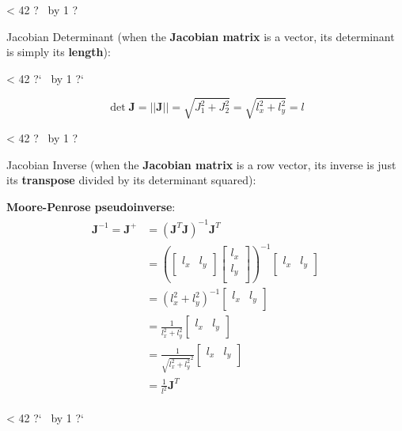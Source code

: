 \documentclass[10pt,b5paper,titlepage]{book}
\newcommand{\m}{\mathbf}
\newcommand{\repeatit}[3][10]{%
    \myloopcounter1%
    \loop\ifnum\myloopcounter < #1
    #2#3%
    \advance\myloopcounter by 1%
    \repeat%
    #2%
}
\newenvironment{qbox}
{
\begin{center}
    \repeatit[42]{?}{\ }
\end{center}
}
{
\begin{center}
    \repeatit[42]{?`}{\ }
\end{center}
}
\newenvironment{eqarray}
{
    \begin{eqnarray}
        \begin{aligned}
}
{
        \end{aligned}
    \end{eqnarray}
}
\begin{document}
\begin{qbox}

    Jacobian Determinant (when the \textbf{Jacobian matrix} is a vector, its
    determinant is simply its \textbf{length}):

\end{qbox}

\begin{equation}
    \det \m{J} = || \m{J} || = \sqrt{J_1^2 + J_2^2} = \sqrt{l_x^2 + l_y^2} = l
\end{equation}


\begin{qbox}

    Jacobian Inverse (when the \textbf{Jacobian matrix} is a row vector, its inverse
    is just its \textbf{transpose} divided by its determinant squared):

    \textbf{Moore-Penrose pseudoinverse}:
    \begin{eqarray}
        \boxed{\m{J}^{-1}} =
        \m{J}^{+} &= \left( \m{J}^T \m{J} \right)^{-1} \m{J}^T \\
                  &= \left(
                      \begin{bmatrix}
                          l_x & l_y \\
                      \end{bmatrix}
                      \begin{bmatrix}
                          l_x \\
                          l_y \\
                      \end{bmatrix}
                  \right)^{-1}
                      \begin{bmatrix}
                          l_x & l_y \\
                      \end{bmatrix} \\
                  &= \left( l_x^2 + l_y^2 \right)^{-1}
                      \begin{bmatrix}
                          l_x & l_y \\
                      \end{bmatrix} \\
                  &= \frac{1}{l_x^2 + l_y^2}
                      \begin{bmatrix}
                          l_x & l_y \\
                      \end{bmatrix} \\
                  &= \frac{1}{\sqrt{l_x^2 + l_y^2}^2}
                      \begin{bmatrix}
                          l_x & l_y \\
                      \end{bmatrix} \\
                  &= \boxed{\frac{1}{l^2} \m{J}^T}
    \end{eqarray}

\end{qbox}
\end{document}
